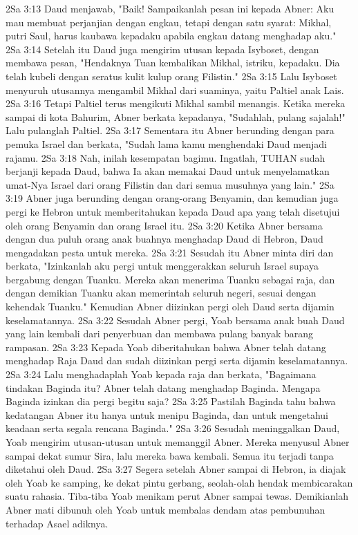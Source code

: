 2Sa 3:13  Daud menjawab, "Baik! Sampaikanlah pesan ini kepada Abner: Aku mau membuat perjanjian dengan engkau, tetapi dengan satu syarat: Mikhal, putri Saul, harus kaubawa kepadaku apabila engkau datang menghadap aku."
2Sa 3:14  Setelah itu Daud juga mengirim utusan kepada Isyboset, dengan membawa pesan, "Hendaknya Tuan kembalikan Mikhal, istriku, kepadaku. Dia telah kubeli dengan seratus kulit kulup orang Filistin."
2Sa 3:15  Lalu Isyboset menyuruh utusannya mengambil Mikhal dari suaminya, yaitu Paltiel anak Lais.
2Sa 3:16  Tetapi Paltiel terus mengikuti Mikhal sambil menangis. Ketika mereka sampai di kota Bahurim, Abner berkata kepadanya, "Sudahlah, pulang sajalah!" Lalu pulanglah Paltiel.
2Sa 3:17  Sementara itu Abner berunding dengan para pemuka Israel dan berkata, "Sudah lama kamu menghendaki Daud menjadi rajamu.
2Sa 3:18  Nah, inilah kesempatan bagimu. Ingatlah, TUHAN sudah berjanji kepada Daud, bahwa Ia akan memakai Daud untuk menyelamatkan umat-Nya Israel dari orang Filistin dan dari semua musuhnya yang lain."
2Sa 3:19  Abner juga berunding dengan orang-orang Benyamin, dan kemudian juga pergi ke Hebron untuk memberitahukan kepada Daud apa yang telah disetujui oleh orang Benyamin dan orang Israel itu.
2Sa 3:20  Ketika Abner bersama dengan dua puluh orang anak buahnya menghadap Daud di Hebron, Daud mengadakan pesta untuk mereka.
2Sa 3:21  Sesudah itu Abner minta diri dan berkata, "Izinkanlah aku pergi untuk menggerakkan seluruh Israel supaya bergabung dengan Tuanku. Mereka akan menerima Tuanku sebagai raja, dan dengan demikian Tuanku akan memerintah seluruh negeri, sesuai dengan kehendak Tuanku." Kemudian Abner diizinkan pergi oleh Daud serta dijamin keselamatannya.
2Sa 3:22  Sesudah Abner pergi, Yoab bersama anak buah Daud yang lain kembali dari penyerbuan dan membawa pulang banyak barang rampasan.
2Sa 3:23  Kepada Yoab diberitahukan bahwa Abner telah datang menghadap Raja Daud dan sudah diizinkan pergi serta dijamin keselamatannya.
2Sa 3:24  Lalu menghadaplah Yoab kepada raja dan berkata, "Bagaimana tindakan Baginda itu? Abner telah datang menghadap Baginda. Mengapa Baginda izinkan dia pergi begitu saja?
2Sa 3:25  Pastilah Baginda tahu bahwa kedatangan Abner itu hanya untuk menipu Baginda, dan untuk mengetahui keadaan serta segala rencana Baginda."
2Sa 3:26  Sesudah meninggalkan Daud, Yoab mengirim utusan-utusan untuk memanggil Abner. Mereka menyusul Abner sampai dekat sumur Sira, lalu mereka bawa kembali. Semua itu terjadi tanpa diketahui oleh Daud.
2Sa 3:27  Segera setelah Abner sampai di Hebron, ia diajak oleh Yoab ke samping, ke dekat pintu gerbang, seolah-olah hendak membicarakan suatu rahasia. Tiba-tiba Yoab menikam perut Abner sampai tewas. Demikianlah Abner mati dibunuh oleh Yoab untuk membalas dendam atas pembunuhan terhadap Asael adiknya.
